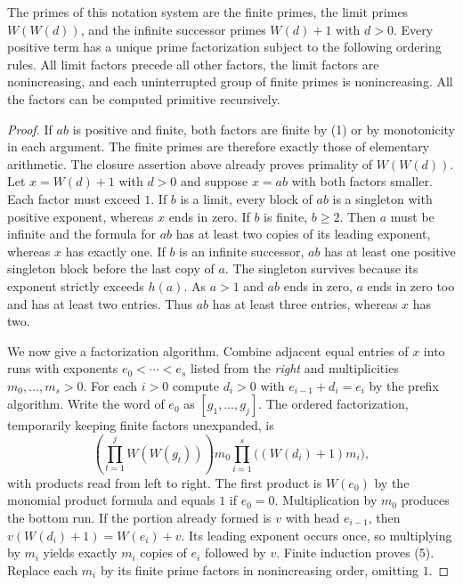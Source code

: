 \begin{theorem}\label{th:ord-primes}
The primes of this notation system are the finite primes, the limit primes
$W(W(d))$, and the infinite successor primes $W(d)+1$ with $d>0$.
Every positive term has a unique prime factorization subject to the
following ordering rules. All limit factors precede all other factors,
the limit factors are nonincreasing, and each uninterrupted group of
finite primes is nonincreasing. All the factors can be computed
primitive recursively.
\end{theorem}
\begin{proof}
If $ab$ is positive and finite, both factors are finite by (1) or
by monotonicity in each argument. The finite primes are therefore
exactly those of elementary arithmetic. The closure assertion above
already proves primality of $W(W(d))$. Let $x=W(d)+1$ with $d>0$
and suppose $x=ab$ with both factors smaller. Each factor must exceed
$1$. If $b$ is a limit, every block of $ab$ is a singleton with
positive exponent, whereas $x$ ends in zero. If $b$ is finite,
$b\ge2$. Then $a$ must be infinite and the formula for $ab$ has at
least two copies of its leading exponent, whereas $x$ has exactly one.
If $b$ is an infinite successor, $ab$ has at least one positive
singleton block before the last copy of $a$. The singleton survives
because its exponent strictly exceeds $h(a)$. As $a>1$ and $ab$ ends in
zero, $a$ ends in zero too and has at least two entries. Thus $ab$ has
at least three entries, whereas $x$ has two.

We now give a factorization algorithm. Combine adjacent equal entries
of $x$ into runs with exponents $e_0<\cdots<e_s$ listed from the
\emph{right} and multiplicities $m_0,\ldots,m_s>0$. For each $i>0$
compute $d_i>0$ with $e_{i-1}+d_i=e_i$ by the prefix algorithm. Write
the word of $e_0$ as $[g_1,\ldots,g_j]$. The ordered factorization,
temporarily keeping finite factors unexpanded, is
\[
 \left(\prod_{t=1}^{j}W(W(g_t))\right)m_0
       \prod_{i=1}^{s}\bigl((W(d_i)+1)m_i\bigr),               \tag{5}
\]
with products read from left to right. The first product is $W(e_0)$
by the monomial product formula and equals $1$ if $e_0=0$.
Multiplication by $m_0$ produces the bottom run. If the portion already
formed is $v$ with head $e_{i-1}$, then
$v(W(d_i)+1)=W(e_i)+v$. Its leading exponent occurs once, so multiplying
by $m_i$ yields exactly $m_i$ copies of $e_i$ followed by $v$.
Finite induction proves (5). Replace each $m_i$ by its finite prime
factors in nonincreasing order, omitting $1$.


\end{proof}
